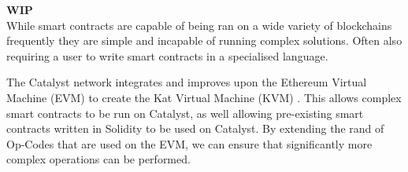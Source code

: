 \textbf{WIP} \\

While smart contracts are capable of being ran on a wide variety of blockchains frequently they are simple and incapable of running complex solutions. Often also requiring a user to write smart contracts in a specialised language. 

The Catalyst network integrates and improves upon the Ethereum Virtual Machine (EVM) to create the Kat Virtual Machine (KVM) \cite{KVM}. This allows complex smart contracts to be run on Catalyst, as well allowing pre-existing smart contracts written in Solidity to be used on Catalyst. By extending the rand of Op-Codes that are used on the EVM, we can ensure that significantly more complex operations can be performed.